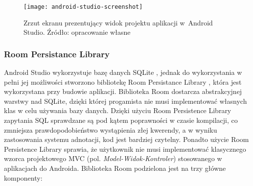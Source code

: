 \documentclass[a4paper,12pt]{article}
\newcommand{\imagewidth}{1.0}
\begin{document}
\begin{figure}[H]
    \centering
    \texttt{[image: android-studio-screenshot]}
    \caption{Zrzut ekranu prezentujący widok projektu aplikacji w~Android Studio. Źródło: opracowanie własne}
    \label{fig:android-studio-screenshot}
\end{figure}

\subsubsection{Room Persistance Library} \label{room}

Android Studio wykorzystuje bazę danych SQLite \cite{sqlite}, jednak do wykorzystania w pełni jej możliwości stworzono bibliotekę Room Persistance Library \cite{room}, która jest wykorzystana przy budowie aplikacji. Biblioteka Room dostarcza abstrakcyjnej warstwy nad SQLite, dzięki której progamista nie musi implementować własnych klas w celu używania bazy danych. Dzięki użyciu Room Persistence Library zapytania SQL sprawdzane są pod kątem poprawności w czasie kompilacji, co zmniejsza prawdopodobieństwo wystąpienia złej kwerendy, a w wyniku zastosowania systemu adnotacji, kod jest bardziej czytelny. Ponadto użycie Room Persistence Library sprawia, że użytkownik nie musi implementować klasycznego wzorca projektowego MVC (pol. \textit{Model-Widok-Kontroler}) stosowanego w aplikacjach do Androida. Biblioteka Room podzielona jest na trzy główne komponenty:
\end{document}
